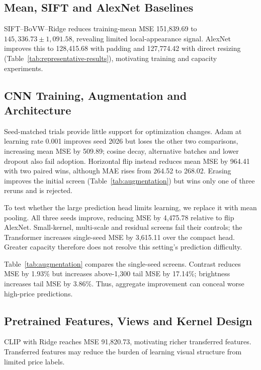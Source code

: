 \documentclass[conference,a4paper]{IEEEtran}
\begin{document}
\subsection{Mean, SIFT and AlexNet Baselines}
SIFT--BoVW--Ridge reduces training-mean MSE 151,839.69 to $145,336.73\pm1,091.58$, revealing limited local-appearance signal. AlexNet improves this to 128,415.68 with padding and 127,774.42 with direct resizing (Table~\ref{tab:representative-results}), motivating training and capacity experiments.

\subsection{CNN Training, Augmentation and Architecture}

Seed-matched trials provide little support for optimization changes. Adam at learning rate 0.001 improves seed 2026 but loses the other two comparisons, increasing mean MSE by 509.89; cosine decay, alternative batches and lower dropout also fail adoption. Horizontal flip instead reduces mean MSE by 964.41 with two paired wins, although MAE rises from 264.52 to 268.02. Erasing improves the initial screen (Table~\ref{tab:augmentation}) but wins only one of three reruns and is rejected.


To test whether the large prediction head limits learning, we replace it with mean pooling. All three seeds improve, reducing MSE by 4,475.78 relative to flip AlexNet. Small-kernel, multi-scale and residual screens fail their controls; the Transformer increases single-seed MSE by 3,615.11 over the compact head. Greater capacity therefore does not resolve this setting's prediction difficulty.

Table~\ref{tab:augmentation} compares the single-seed screens. Contrast reduces MSE by 1.93\% but increases above-1,300 tail MSE by 17.14\%; brightness increases tail MSE by 3.86\%. Thus, aggregate improvement can conceal worse high-price predictions.





\subsection{Pretrained Features, Views and Kernel Design}
CLIP with Ridge reaches MSE 91,820.73, motivating richer transferred features. Transferred features may reduce the burden of learning visual structure from limited price labels.
\end{document}
